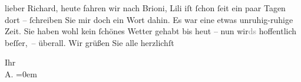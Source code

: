 \pstart{}lieber Richard,\pend\vspace{0.5em}
\pstart
           heute fahren wir nach Brioni, Lili iſt{ }ſchon{ }ſeit ein paar Tagen dort –{ }ſchreiben Sie mir doch ein Wort dahin. Es war eine etwas unruhig-ruhige Zeit. Sie
               haben wohl kein{ }ſchönes Wetter gehabt bis heut – {\pb}nun
                  wir\textcolor{gray}{ds} hoffentlich beſſer, – überall. Wir grüßen Sie alle
               herzlichſt\pend
           
\pstart
           Ihr{\\[\baselineskip]}\spacefill\mbox{A.}\pend
           \leftskip=0em{}\endnumbering{}  \newcommand{\dateiname}{L02145}\newcommand{\titel}{Arthur Schnitzler an Richard Beer-Hofmann, 23. 7. 1913}\newcommand{\editorInnen}{Martin Anton Müller und Gerd-Hermann Susen}
